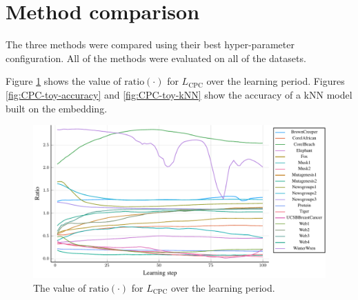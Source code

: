 \section{Method comparison}
The three methods were compared using their best hyper-parameter configuration. All of the methods were evaluated on all of the datasets.

Figure \ref{fig:CPC-toy-ratio} shows the value of \( \mathrm{ratio} \left( \cdot \right) \) for \( L_\mathrm{CPC} \) over the learning period. Figures \ref{fig:CPC-toy-accuracy} and \ref{fig:CPC-toy-kNN} show the accuracy of a kNN model built on the embedding.

\begin{figure}[h]
  \centering
  \includegraphics[width=\textwidth]{images/CPC-toy/ratio/CPC-toy-ratio.pdf}
  \caption{The value of \( \mathrm{ratio} \left( \cdot \right) \) for \( L_\mathrm{CPC} \) over the learning period.}\label{fig:CPC-toy-ratio}
\end{figure}

